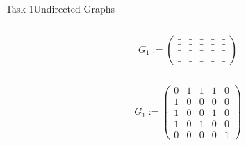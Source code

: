 \begin{frame}[allowframebreaks]{Task 1}{Undirected Graphs}
  \begin{solutionnoinc}
    \begin{columns}
      \begin{column}{0.5\textwidth}
      \end{column}
      \begin{column}{0.5\textwidth} 
        \centering
        $G_1 :=
        \begin{pmatrix}
        \_ & \_ & \_ & \_ & \_ \\
        \_ & \_ & \_ & \_ & \_ \\
        \_ & \_ & \_ & \_ & \_ \\
        \_ & \_ & \_ & \_ & \_ \\
        \_ & \_ & \_ & \_ & \_
        \end{pmatrix}$
      \end{column}
    \end{columns}
  \end{solutionnoinc}
  \begin{solutionnoinc}
    \begin{columns}
      \begin{column}{0.5\textwidth}
      \end{column}
      \begin{column}{0.5\textwidth} 
        \centering
        $G_1 :=
        \begin{pmatrix}
        0 & 1 & 1 & 1 & 0 \\
        1 & 0 & 0 & 0 & 0 \\
        1 & 0 & 0 & 1 & 0 \\
        1 & 0 & 1 & 0 & 0 \\
        0 & 0 & 0 & 0 & 1
        \end{pmatrix}$
      \end{column}
    \end{columns}
  \end{solutionnoinc}
  \begin{solutionnoinc}
    \begin{columns}
      \begin{column}{0.4\textwidth}
      \end{column}
\end{columns}
\end{solutionnoinc}
\end{frame}
